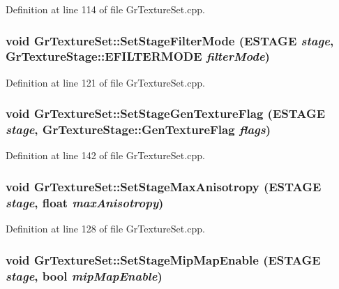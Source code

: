 Definition at line 114 of file GrTextureSet.cpp.\hypertarget{class_gr_texture_set_f5f363721577f3292710f2c9fb87a533}{
\subsubsection[{SetStageFilterMode}]{\setlength{\rightskip}{0pt plus 5cm}void GrTextureSet::SetStageFilterMode ({\bf ESTAGE} {\em stage}, \/  {\bf GrTextureStage::EFILTERMODE} {\em filterMode})}}
\label{class_gr_texture_set_f5f363721577f3292710f2c9fb87a533}




Definition at line 121 of file GrTextureSet.cpp.\hypertarget{class_gr_texture_set_8f996772ab64a180e260d4e6d311f707}{
\subsubsection[{SetStageGenTextureFlag}]{\setlength{\rightskip}{0pt plus 5cm}void GrTextureSet::SetStageGenTextureFlag ({\bf ESTAGE} {\em stage}, \/  {\bf GrTextureStage::GenTextureFlag} {\em flags})}}
\label{class_gr_texture_set_8f996772ab64a180e260d4e6d311f707}




Definition at line 142 of file GrTextureSet.cpp.\hypertarget{class_gr_texture_set_fdcf0c1c4c381358c7c96c99669e5053}{
\subsubsection[{SetStageMaxAnisotropy}]{\setlength{\rightskip}{0pt plus 5cm}void GrTextureSet::SetStageMaxAnisotropy ({\bf ESTAGE} {\em stage}, \/  float {\em maxAnisotropy})}}
\label{class_gr_texture_set_fdcf0c1c4c381358c7c96c99669e5053}




Definition at line 128 of file GrTextureSet.cpp.\hypertarget{class_gr_texture_set_6ce6f42858927200277598b47080f125}{
\subsubsection[{SetStageMipMapEnable}]{\setlength{\rightskip}{0pt plus 5cm}void GrTextureSet::SetStageMipMapEnable ({\bf ESTAGE} {\em stage}, \/  bool {\em mipMapEnable})}}
\label{class_gr_texture_set_6ce6f42858927200277598b47080f125}




